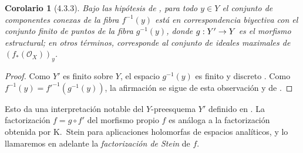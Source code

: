 \documentclass[10pt,oneside,openany]{book}
\theoremstyle{egaenv}\newtheorem*{env}{---}
\theoremstyle{egastatement}
\newtheorem*{corollary}{Corolario}
\theoremstyle{egadescription}
\renewcommand{\to}{\mathchoice{\longrightarrow}{\rightarrow}{\rightarrow}{\rightarrow}}
\begin{document}
\begin{corollary}[4.3.3]
\label{III.4.3.3}
\label{III.4.3.3-fr}
Bajo las hipótesis de , para todo $y\in Y$ el conjunto
de componentes conexas de la fibra $f^{-1}(y)$ está en correspondencia
biyectiva con el conjunto finito de puntos de la fibra
$g^{-1}(y)$, donde $g:Y'\to Y$ es el morfismo estructural; en otros
términos, corresponde al conjunto de \emph{ideales maximales} de
$(f_*(\mathcal O_X))_y$.
\end{corollary}

\begin{proof}
Como $Y'$ es finito sobre $Y$, el espacio $g^{-1}(y)$ es finito y
discreto . Como
$f^{-1}(y)=f'^{-1}(g^{-1}(y))$,
la afirmación se sigue de esta observación y de
.
\end{proof}

Esto da una interpretación notable del $Y$-preesquema $Y'$ definido en
. La factorización
$f=g\circ f'$ del morfismo propio $f$ es análoga a la factorización
obtenida por K.~Stein para aplicaciones holomorfas de espacios
analíticos, y lo llamaremos en adelante la \emph{factorización de Stein}
de $f$.
\end{document}
